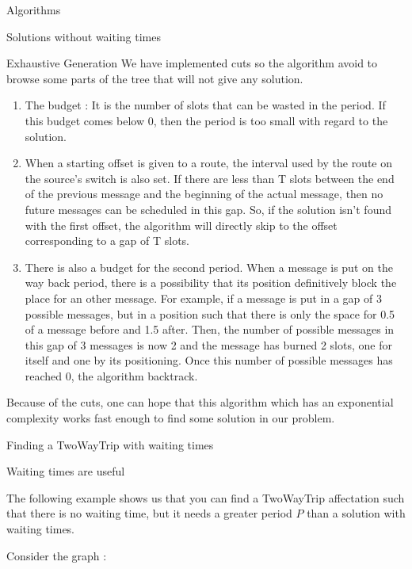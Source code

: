 \documentclass[a4paper,10pt]{report}
\begin{document}
\begin{chapter}{Algorithms}
\begin{section}{Solutions without waiting times}
\begin{subsection}{Exhaustive Generation}
We have implemented cuts so the algorithm avoid to browse some parts of the tree that will not give any solution.
\begin{enumerate}
 \item The budget : It is the number of slots that can be wasted in the period. If this budget comes below 0, then the period is too small with regard to
 the solution.
 \item When a starting offset is given to a route, the interval used by the route on the source's switch is also set. If there are less than T slots
 between the end of the previous message and the beginning of the actual message, then no future messages can be scheduled in this gap.
 So, if the solution isn't found with the first offset, the algorithm will directly skip to the offset corresponding to a gap of T slots.
 \item There is also a budget for the second period. When a message is put on the way back period, there is a possibility that its position definitively block the place for an other message. For example, if a message is put in a gap of 3 possible messages, but in a position such that there is only the space for 0.5 of a message before and 1.5 after. Then, the number of possible messages in this gap of 3 messages is now 2 and the message has burned 2 slots, one for itself and one by its positioning.
 Once this number of possible messages has reached 0, the algorithm backtrack.
\end{enumerate}

Because of the cuts, one can hope that this algorithm which has an exponential complexity works fast enough to find some solution in our problem.

\end{subsection}

 \end{section}

\begin{section}{Finding a TwoWayTrip with waiting times}
\begin{subsection}{Waiting times are useful}
 
The following example shows us that you can find a TwoWayTrip affectation such that there is no waiting time, but it needs a greater period $P$ than a
solution with waiting times.

Consider the graph : 
\begin{center}
 
\end{center}
\end{subsection}
\end{section}
\end{chapter}
\end{document}
